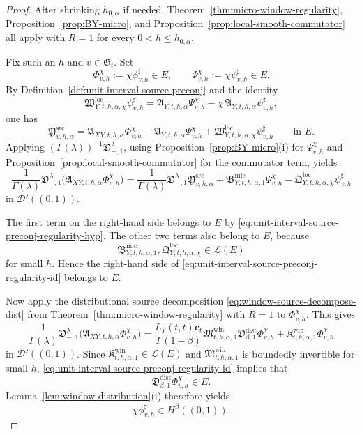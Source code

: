 \documentclass[11pt,a4paper]{amsart}
\theoremstyle{plain}
\theoremstyle{definition}
\theoremstyle{remark}
\begin{document}
\begin{proof}
After shrinking \(h_{0,\alpha}\) if needed, Theorem~\ref{thm:micro-window-regularity},
Proposition~\ref{prop:BY-micro}, and Proposition~\ref{prop:local-smooth-commutator} all apply with
\(R=1\) for every \(0<h\le h_{0,\alpha}\).

Fix such an \(h\) and \(v\in\mathfrak G_t\). Set
\[
\Phi_{v,h}^{\chi}:=\chi\phi_{v,h}^{\sharp}\in E,
\qquad
\Psi_{v,h}^{\chi}:=\chi\psi_{v,h}^{\sharp}\in E.
\]
By Definition~\ref{def:unit-interval-source-preconj} and the identity
\[
\mathfrak W_{Y,t,h,\alpha,\chi}^{\mathrm{loc}}\psi_{v,h}^{\sharp}
=
\mathfrak A_{Y,t,h,\alpha}\Psi_{v,h}^{\chi}
-\chi\,\mathfrak A_{Y,t,h,\alpha}\psi_{v,h}^{\sharp},
\]
one has
\[
\mathfrak Y_{v,h,\alpha}^{\mathrm{src}}
=
\mathfrak A_{XY,t,h,\alpha}\Phi_{v,h}^{\chi}
-\mathfrak A_{Y,t,h,\alpha}\Psi_{v,h}^{\chi}
+\mathfrak W_{Y,t,h,\alpha,\chi}^{\mathrm{loc}}\psi_{v,h}^{\sharp}
\qquad\text{in }E.
\]
Applying \((\Gamma(\lambda))^{-1}\mathfrak D_{-,1}^{\lambda}\), using
Proposition~\ref{prop:BY-micro}(i) for \(\Psi_{v,h}^{\chi}\) and
Proposition~\ref{prop:local-smooth-commutator} for the commutator term, yields
\begin{equation}\label{eq:unit-interval-source-preconj-regularity-id}
\frac{1}{\Gamma(\lambda)}
\mathfrak D_{-,1}^{\lambda}
\bigl(
\mathfrak A_{XY,t,h,\alpha}\Phi_{v,h}^{\chi}
\bigr)
=
\frac{1}{\Gamma(\lambda)}
\mathfrak D_{-,1}^{\lambda}
\mathfrak Y_{v,h,\alpha}^{\mathrm{src}}
+
\mathfrak B_{Y,t,h,\alpha,1}^{\mathrm{mic}}\Psi_{v,h}^{\chi}
-\mathfrak Q_{Y,t,h,\alpha,\chi}^{\mathrm{loc}}\psi_{v,h}^{\sharp}
\end{equation}
in \(\mathcal D'((0,1))\).

The first term on the right-hand side belongs to \(E\) by
\eqref{eq:unit-interval-source-preconj-regularity-hyp}. The other two terms also belong to \(E\),
because
\[
\mathfrak B_{Y,t,h,\alpha,1}^{\mathrm{mic}},
\mathfrak Q_{Y,t,h,\alpha,\chi}^{\mathrm{loc}}
\in\mathcal L(E)
\]
for small \(h\). Hence the right-hand side of
\eqref{eq:unit-interval-source-preconj-regularity-id} belongs to \(E\).

Now apply the distributional source decomposition
\eqref{eq:window-source-decompose-dist} from
Theorem~\ref{thm:micro-window-regularity} with \(R=1\) to \(\Phi_{v,h}^{\chi}\). This gives
\[
\frac{1}{\Gamma(\lambda)}
\mathfrak D_{-,1}^{\lambda}
\bigl(
\mathfrak A_{XY,t,h,\alpha}\Phi_{v,h}^{\chi}
\bigr)
=
\frac{L_Y(t,t)\mathbf c_t}{\Gamma(1-\beta)}
\mathfrak M_{t,h,\alpha,1}^{\mathrm{win}}
\mathfrak D_{\beta,1}^{\mathrm{dist}}\Phi_{v,h}^{\chi}
+
\mathfrak K_{t,h,\alpha,1}^{\mathrm{win}}\Phi_{v,h}^{\chi}
\]
in \(\mathcal D'((0,1))\). Since
\(\mathfrak K_{t,h,\alpha,1}^{\mathrm{win}}\in\mathcal L(E)\) and
\(\mathfrak M_{t,h,\alpha,1}^{\mathrm{win}}\) is boundedly invertible for small \(h\),
\eqref{eq:unit-interval-source-preconj-regularity-id} implies that
\[
\mathfrak D_{\beta,1}^{\mathrm{dist}}\Phi_{v,h}^{\chi}\in E.
\]
Lemma~\ref{lem:window-distribution}(i) therefore yields
\[
\chi\phi_{v,h}^{\sharp}\in H^\beta((0,1)).
\]


\end{proof}
\end{document}
